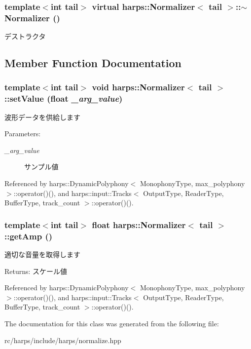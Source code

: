 \subsubsection[$\sim$Normalizer]{\setlength{\rightskip}{0pt plus 5cm}template$<$int tail$>$ virtual {\bf harps::Normalizer}$<$ tail $>$::$\sim${\bf Normalizer} ()\hspace{0.3cm}{\tt  [inline, virtual]}}\label{classharps_1_1Normalizer_fb364666ac8e946a921ff2f923f71fcf}


デストラクタ 

\subsection{Member Function Documentation}
\subsubsection[setValue]{\setlength{\rightskip}{0pt plus 5cm}template$<$int tail$>$ void {\bf harps::Normalizer}$<$ tail $>$::setValue (float {\em \_\-arg\_\-value})\hspace{0.3cm}{\tt  [inline]}}\label{classharps_1_1Normalizer_719c26a532ee603de347033951b9e7ba}


波形データを供給します \begin{Desc}
\item[Parameters:]
\begin{description}
\item[{\em \_\-arg\_\-value}]サンプル値 \end{description}
\end{Desc}


Referenced by harps::DynamicPolyphony$<$ MonophonyType, max\_\-polyphony $>$::operator()(), and harps::input::Tracks$<$ OutputType, ReaderType, BufferType, track\_\-count $>$::operator()().
\subsubsection[getAmp]{\setlength{\rightskip}{0pt plus 5cm}template$<$int tail$>$ float {\bf harps::Normalizer}$<$ tail $>$::getAmp ()\hspace{0.3cm}{\tt  [inline]}}\label{classharps_1_1Normalizer_b4d4314f348404d2e96d2d22b3f1ced7}


適切な音量を取得します \begin{Desc}
\item[Returns:]スケール値 \end{Desc}


Referenced by harps::DynamicPolyphony$<$ MonophonyType, max\_\-polyphony $>$::operator()(), and harps::input::Tracks$<$ OutputType, ReaderType, BufferType, track\_\-count $>$::operator()().

The documentation for this class was generated from the following file:\begin{CompactItemize}
\item 
rc/harps/include/harps/normalize.hpp\end{CompactItemize}
